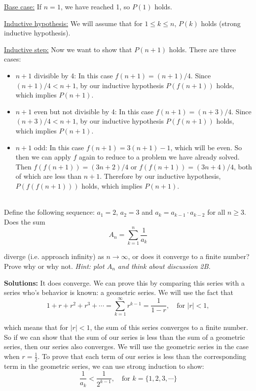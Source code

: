 \documentclass[11pt]{article}
\newif\ifsolutions
\begin{document}
\begin{qunlist}
{\underline{Base case:} If $n=1$, we have reached 1, so $P(1)$ holds.

\underline{Inductive hypothesis:} We will assume that for $1 \leq k \leq n$, $P(k)$ holds (strong inductive hypothesis).

\underline{Inductive step:} Now we want to show that $P(n+1)$ holds. There are three cases:

\begin{itemize}
\item $n+1$ divisible by 4: In this case $f(n+1) = (n+1)/4$. Since $(n+1)/4 < n+1$, by our inductive hypothesis $P(f(n+1))$ holds, which implies $P(n+1)$.
\item $n+1$ even but not divisible by 4: In this case $f(n+1) = (n+3)/4$. Since $(n+3)/4 < n+1$, by our inductive hypothesis $P(f(n+1))$ holds, which implies $P(n+1)$.
\item $n+1$ odd: In this case $f(n+1) = 3(n+1) - 1$, which will be even.  So then we can apply $f$ again to reduce to a problem we have already solved.  Then $f(f(n+1)) = (3n+2)/4$ or $f(f(n+1)) = (3n+4)/4$, both of which are less than $n+1$.  Therefore by our inductive hypothesis, $P(f(f(n+1)))$ holds, which implies $P(n+1)$.
\end{itemize}

}
\fi


 \\
Define the following sequence: $a_1 =2$, $a_2 = 3$ and $a_k = a_{k-1} \cdot a_{k-2}$ for all $n \geq 3$. \\ 
Does the sum 
\[ A_n = \sum_{k=1}^n \frac{1}{a_k} \]

diverge (i.e. approach infinity) as $n \to \infty$, or does it converge to a finite number?  
Prove why or why not.
{\em Hint: plot $A_n$ and think about discussion 2B.}

\ifsolutions
\textbf{Solutions:}
It does converge. We can prove this by comparing this series with a series who's behavior is known: a geometric series. We will use the fact that
\[ 1 + r + r^2 + r^3 + \cdots = \sum_{k=1}^{\infty} r^{k-1} = \frac{1}{1-r}, \quad \text{for } |r| < 1, \]

which means that for $|r| < 1$, the sum of this series converges to a finite number. So if we can show that the sum of our series is less than the sum of a geometric series, then our series also converges. We will use the geometric series in the case when $r = \frac{1}{2}$. To prove that each term of our series is less than the corresponding term in the geometric series, we can use strong induction to show:
\[ \frac{1}{a_k} < \frac{1}{2^{k-1}}, \quad \text{for } k = \{1,2,3,\cdots\} \] 


\end{qunlist}
\end{document}
